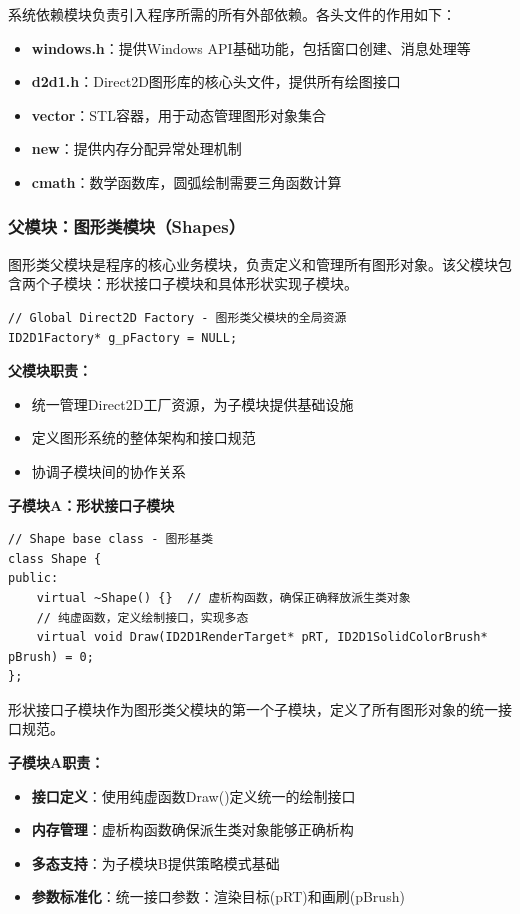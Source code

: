 \documentclass[12pt,a4paper]{article}
\begin{document}
系统依赖模块负责引入程序所需的所有外部依赖。各头文件的作用如下：
\begin{itemize}
    \item \textbf{windows.h}：提供Windows API基础功能，包括窗口创建、消息处理等
    \item \textbf{d2d1.h}：Direct2D图形库的核心头文件，提供所有绘图接口
    \item \textbf{vector}：STL容器，用于动态管理图形对象集合
    \item \textbf{new}：提供内存分配异常处理机制
    \item \textbf{cmath}：数学函数库，圆弧绘制需要三角函数计算
\end{itemize}

\subsubsection{父模块：图形类模块（Shapes）}

图形类父模块是程序的核心业务模块，负责定义和管理所有图形对象。该父模块包含两个子模块：形状接口子模块和具体形状实现子模块。

\begin{lstlisting}[caption=图形类父模块全局资源]
// Global Direct2D Factory - 图形类父模块的全局资源
ID2D1Factory* g_pFactory = NULL;
\end{lstlisting}

\textbf{父模块职责：}
\begin{itemize}
    \item 统一管理Direct2D工厂资源，为子模块提供基础设施
    \item 定义图形系统的整体架构和接口规范
    \item 协调子模块间的协作关系
\end{itemize}

\textbf{子模块A：形状接口子模块}

\begin{lstlisting}[caption=形状基类定义]
// Shape base class - 图形基类
class Shape {
public:
    virtual ~Shape() {}  // 虚析构函数，确保正确释放派生类对象
    // 纯虚函数，定义绘制接口，实现多态
    virtual void Draw(ID2D1RenderTarget* pRT, ID2D1SolidColorBrush* pBrush) = 0;
};
\end{lstlisting}

形状接口子模块作为图形类父模块的第一个子模块，定义了所有图形对象的统一接口规范。

\textbf{子模块A职责：}
\begin{itemize}
    \item \textbf{接口定义}：使用纯虚函数Draw()定义统一的绘制接口
    \item \textbf{内存管理}：虚析构函数确保派生类对象能够正确析构
    \item \textbf{多态支持}：为子模块B提供策略模式基础
    \item \textbf{参数标准化}：统一接口参数：渲染目标(pRT)和画刷(pBrush)
\end{itemize}
\end{document}
